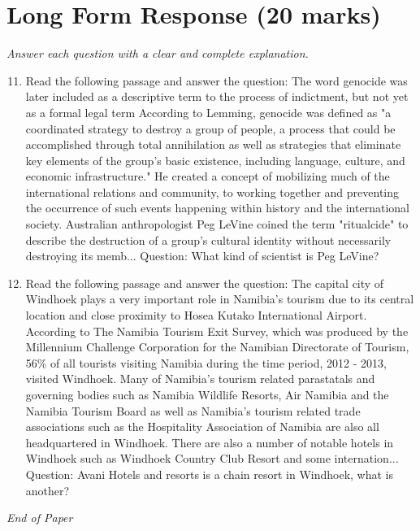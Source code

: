 \documentclass[12pt]{article}
\begin{document}
\section*{Long Form Response (20 marks)}
\textit{Answer each question with a clear and complete explanation.}
\begin{enumerate}[label=\arabic*.]
\setcounter{enumi}{10}
\item Read the following passage and answer the question: The word genocide was later included as a descriptive term to the process of indictment, but not yet as a formal legal term According to Lemming, genocide was defined as "a coordinated strategy to destroy a group of people, a process that could be accomplished through total annihilation as well as strategies that eliminate key elements of the group's basic existence, including language, culture, and economic infrastructure." He created a concept of mobilizing much of the international relations and community, to working together and preventing the occurrence of such events happening within history and the international society. Australian anthropologist Peg LeVine coined the term "ritualcide" to describe the destruction of a group's cultural identity without necessarily destroying its memb... Question: What kind of scientist is Peg LeVine?
\item Read the following passage and answer the question: The capital city of Windhoek plays a very important role in Namibia's tourism due to its central location and close proximity to Hosea Kutako International Airport. According to The Namibia Tourism Exit Survey, which was produced by the Millennium Challenge Corporation for the Namibian Directorate of Tourism, 56\% of all tourists visiting Namibia during the time period, 2012 - 2013, visited Windhoek. Many of Namibia's tourism related parastatals and governing bodies such as Namibia Wildlife Resorts, Air Namibia and the Namibia Tourism Board as well as Namibia's tourism related trade associations such as the Hospitality Association of Namibia are also all headquartered in Windhoek. There are also a number of notable hotels in Windhoek such as Windhoek Country Club Resort and some internation... Question: Avani Hotels and resorts is a chain resort in Windhoek, what is another?
\end{enumerate}

\vfill
\noindent\textit{End of Paper}
\end{document}
